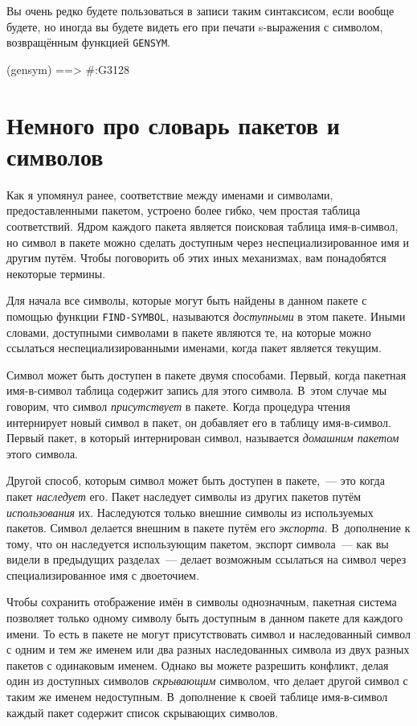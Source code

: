 Вы очень редко будете пользоваться в записи таким синтаксисом, если вообще будете, но
иногда вы будете видеть его при печати s-выражения с символом, возвращённым функцией
\lstinline{GENSYM}.

\begin{myverb}
(gensym) ==> #:G3128
\end{myverb}

\section{Немного про словарь пакетов и символов}

Как я упомянул ранее, соответствие между именами и символами, предоставленными пакетом,
устроено более гибко, чем простая таблица соответствий.  Ядром каждого пакета является
поисковая таблица имя-в-символ, но символ в пакете можно сделать доступным через
неспециализированное имя и другим путём. Чтобы поговорить об этих иных механизмах, вам
понадобятся некоторые термины.

Для начала все символы, которые могут быть найдены в данном пакете с по\-мощью функции
\lstinline{FIND-SYMBOL}, называются \textit{доступными} в этом пакете.  Иными словами,
доступными символами в пакете являются те, на которые можно ссылаться
неспециализированными именами, когда пакет является текущим.

Символ может быть доступен в пакете двумя способами. Первый, когда пакетная имя-в-символ
таблица содержит запись для этого символа. В~этом случае мы говорим, что символ
\textit{присутствует} в пакете. Когда процедура чтения интернирует новый символ в пакет, он
добавляет его в таблицу имя-в-символ. Первый пакет, в который интернирован символ,
называется \textit{домашним пакетом} этого символа.

Другой способ, которым символ может быть доступен в пакете,~--- это когда пакет
\textit{наследует} его.  Пакет наследует символы из других пакетов путём
\textit{использования} их. Наследуются только внешние символы из используемых
пакетов. Символ делается внешним в пакете путём его \textit{экспорта}. В~дополнение к
тому, что он наследуется ис\-поль\-зую\-щим пакетом, экспорт символа~--- как вы видели в
предыдущих разделах~--- делает возможным ссылаться на символ через специализированное имя с
двоеточием.

Чтобы сохранить отображение имён в символы однозначным, пакетная система позволяет только
одному символу быть доступным в данном пакете для каждого имени.  То есть в пакете не
могут присутствовать символ и наследованный символ с одним и тем же именем или два разных
наследованных символа из двух разных пакетов с одинаковым именем. Однако вы можете
разрешить конфликт, делая один из доступных символов \textit{скрывающим} символом, что
делает другой символ с таким же именем недоступным. В~дополнение к своей таблице
имя-в-символ каждый пакет содержит список скрывающих символов.

